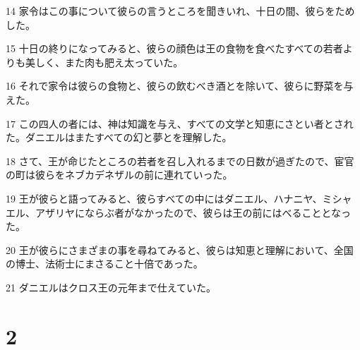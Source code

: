 \par 14 家令はこの事について彼らの言うところを聞きいれ、十日の間、彼らをためした。
\par 15 十日の終りになってみると、彼らの顔色は王の食物を食べたすべての若者よりも美しく、また肉も肥え太っていた。
\par 16 それで家令は彼らの食物と、彼らの飲むべき酒とを除いて、彼らに野菜を与えた。
\par 17 この四人の者には、神は知識を与え、すべての文学と知恵にさとい者とされた。ダニエルはまたすべての幻と夢とを理解した。
\par 18 さて、王が命じたところの若者を召し入れるまでの日数が過ぎたので、宦官の町は彼らをネブカデネザルの前に連れていった。
\par 19 王が彼らと語ってみると、彼らすべての中にはダニエル、ハナニヤ、ミシャエル、アザリヤにならぶ者がなかったので、彼らは王の前にはべることとなった。
\par 20 王が彼らにさまざまの事を尋ねてみると、彼らは知恵と理解において、全国の博士、法術士にまさること十倍であった。
\par 21 ダニエルはクロス王の元年まで仕えていた。

\chapter{2}

